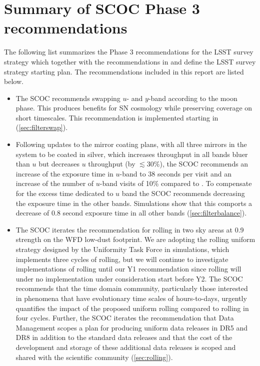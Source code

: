 \section{Summary of SCOC Phase 3 recommendations}\label{sec:summary}
The following list summarizes the Phase 3 recommendations for the LSST survey strategy which together with the recommendations in  and  define the LSST survey strategy starting plan.   The recommendations included in this report are listed below.

\begin{itemize}
\item The SCOC recommends swapping $u$- and $y$-band according to the moon phase. This produces benefits for SN cosmology while preserving coverage on short timescales. This recommendation is implemented starting in  (\autoref{sec:filterswap}).




\item Following updates to the mirror coating plans, with all three mirrors in the system to be coated in silver, which increases throughput in all bands bluer than $u$ but decreases $u$ throughput (by $\lesssim30\%$), the SCOC recommends an increase of the exposure time in $u$-band to 38 seconds per visit and an increase of the number of $u$-band visits of 10\% compared to . To compensate for the excess time dedicated to $u$ band the SCOC recommends decreasing the exposure time in the other bands. Simulations show that this comports a decrease of 0.8 second exposure time in all other bands (\autoref{sec:filterbalance}).

\item {The SCOC iterates the recommendation for rolling in two sky areas at 0.9 strength on the WFD low-dust footprint. We are adopting the rolling uniform strategy designed by the Uniformity Task Force in  simulations, which implements three cycles of rolling, but we will continue to investigate implementations of rolling until our Y1 recommendation since rolling will under no implementation under consideration start before Y2.  The SCOC recommends that the time domain community, particularly those interested in phenomena that have evolutionary time scales of hours-to-days, urgently quantifies the impact of the proposed uniform rolling compared to rolling in four cycles. Further, the SCOC iterates the recommendation that Data Management scopes a plan for producing uniform data releases in DR5 and DR8 in addition to the standard data releases and that the cost of the development and storage of these additional data releases is scoped and shared with the scientific community (\autoref{sec:rolling}).} 


\end{itemize}
